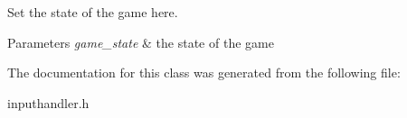 Set the state of the game here. 


\begin{DoxyParams}{Parameters}
{\em game\-\_\-state} & the state of the game \\
\hline
\end{DoxyParams}


The documentation for this class was generated from the following file\-:\begin{DoxyCompactItemize}
\item 
inputhandler.\-h\end{DoxyCompactItemize}
